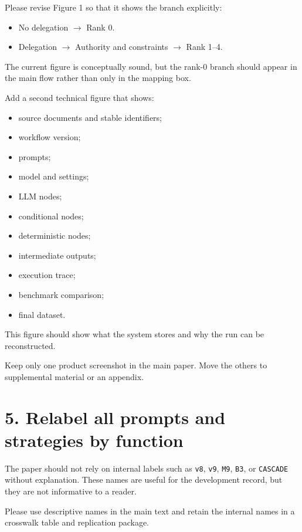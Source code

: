\documentclass[11pt]{article}
\begin{document}
Please revise Figure 1 so that it shows the branch explicitly:

\begin{itemize}
    \item No delegation \(\rightarrow\) Rank 0.
    \item Delegation \(\rightarrow\) Authority and constraints \(\rightarrow\) Rank 1--4.
\end{itemize}

The current figure is conceptually sound, but the rank-0 branch should appear in the main flow rather than only in the mapping box.

Add a second technical figure that shows:

\begin{itemize}
    \item source documents and stable identifiers;
    \item workflow version;
    \item prompts;
    \item model and settings;
    \item LLM nodes;
    \item conditional nodes;
    \item deterministic nodes;
    \item intermediate outputs;
    \item execution trace;
    \item benchmark comparison;
    \item final dataset.
\end{itemize}

This figure should show what the system stores and why the run can be reconstructed.

Keep only one product screenshot in the main paper. Move the others to supplemental material or an appendix.

\section*{5. Relabel all prompts and strategies by function}

The paper should not rely on internal labels such as \texttt{v8}, \texttt{v9}, \texttt{M9}, \texttt{B3}, or \texttt{CASCADE} without explanation. These names are useful for the development record, but they are not informative to a reader.

Please use descriptive names in the main text and retain the internal names in a crosswalk table and replication package.
\end{document}
